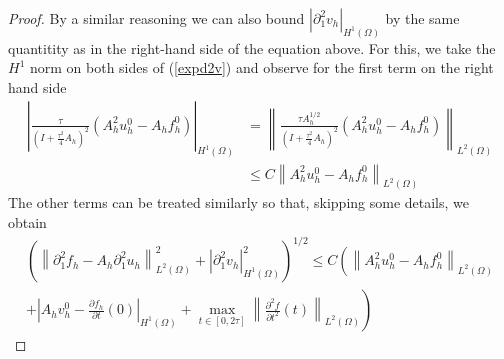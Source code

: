 \documentclass{imanum}
\begin{document}
\begin{proof}
By a similar reasoning we can also bound $\left| {\partial}^2_{1} v_h \right|_{H^1(\Omega)}$ by the same quantitity as in the right-hand side of the equation above. 
For this, we take the $H^1$ norm on both sides of (\ref{expd2v}) and observe for the first term on the right hand side
\begin{align*}
\left| 
\frac{\tau}{\left( I + \frac{\tau^2}{4} A_h \right)^2}  \left(A_h^2 u^0_h - A_h f^0_h\right)
\right|_{H^1(\Omega)}
&= \left\| 
\frac{\tau A_h^{1/2}}{\left( I + \frac{\tau^2}{4} A_h \right)^2}  \left(A_h^2 u^0_h - A_h f^0_h\right)
\right\|_{L^2(\Omega)}
\\
&\le C \left\| 
 A_h^2 u^0_h - A_h f^0_h
\right\|_{L^2(\Omega)}
\end{align*}
The other terms can be treated similarly so that, skipping some details, we obtain
\begin{multline}\label{boundedness}
 \left(\left\| \partial^{2}_1f_h-A_h\partial^{2}_1 u_h \right\|_{L^2(\Omega)}^2 + \left| {\partial}^2_{1} v_h \right|_{H^1(\Omega)}^2\right)^{{1}/{2}}
\leq C \left( \left\|A_h^2 u^0_h - A_h f^0_h
   \right\|_{L^2(\Omega)}\right.\\
   \left.+  \left|A_h v^0_h - \frac{\partial f_h}{\partial t}(0) \right|_{H^1(\Omega)} 
   + \max_{t\in[0,2\tau]}\left\|\frac{\partial^2 f}{\partial t^2}(t)\right\|_{L^2(\Omega)} \right) 
\end{multline}   


\end{proof}
\end{document}
